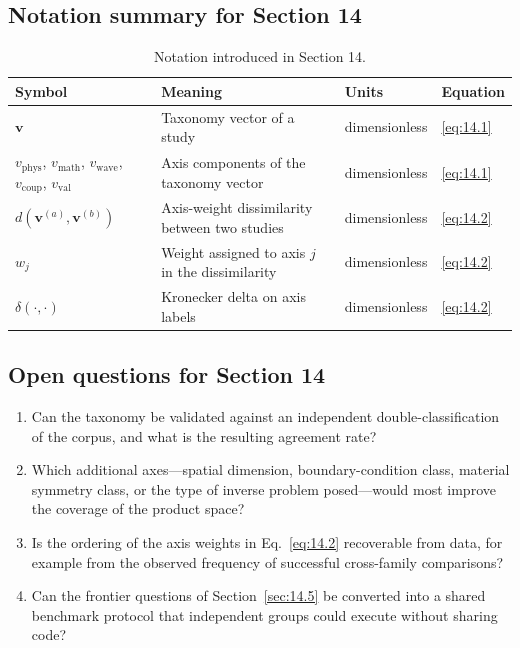 \subsection{Notation summary for Section 14}

\begin{table}[htbp]
\centering
\small
\caption{Notation introduced in Section 14.}
\label{tab:notation-sec14}
\begin{tabularx}{\textwidth}{@{}p{1.8cm}X p{2.2cm}p{2.1cm}@{}}
\toprule
\textbf{Symbol} & \textbf{Meaning} & \textbf{Units} & \textbf{Equation} \\
\midrule
$\bm{v}$ & Taxonomy vector of a study & dimensionless & \eqref{eq:14.1} \\
$v_{\text{phys}}$, $v_{\text{math}}$, $v_{\text{wave}}$, $v_{\text{coup}}$, $v_{\text{val}}$ & Axis components of the taxonomy vector & dimensionless & \eqref{eq:14.1} \\
$d(\bm{v}^{(a)},\bm{v}^{(b)})$ & Axis-weight dissimilarity between two studies & dimensionless & \eqref{eq:14.2} \\
$w_j$ & Weight assigned to axis $j$ in the dissimilarity & dimensionless & \eqref{eq:14.2} \\
$\delta(\cdot,\cdot)$ & Kronecker delta on axis labels & dimensionless & \eqref{eq:14.2} \\
\bottomrule
\end{tabularx}
\end{table}

\subsection{Open questions for Section 14}

\begin{enumerate}[label=\textbf{OQ14.\arabic*}]
\item Can the taxonomy be validated against an independent double-classification of the corpus, and what is the resulting agreement rate? \label{oq:14.1}
\item Which additional axes---spatial dimension, boundary-condition class, material symmetry class, or the type of inverse problem posed---would most improve the coverage of the product space? \label{oq:14.2}
\item Is the ordering of the axis weights in Eq.~\eqref{eq:14.2} recoverable from data, for example from the observed frequency of successful cross-family comparisons?
\item Can the frontier questions of Section~\ref{sec:14.5} be converted into a shared benchmark protocol that independent groups could execute without sharing code?
\end{enumerate}

